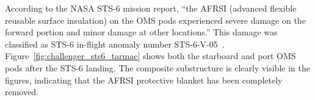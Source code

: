 According to the NASA STS-6 mission report, ``the AFRSI (advanced flexible reusable surface insulation) on the OMS pods experienced severe damage on the forward portion and minor damage at other locations.''  This damage was classified as STS-6 in-flight anomaly number STS-6-V-05~\cite{shuttle_ifa_list}. Figure~\ref{fig:challenger_sts6_tarmac} shows both the starboard and port OMS pods after the STS-6 landing.  The composite substructure is clearly visible in the figures, indicating that the AFRSI protective blanket has been completely removed.
\begin{figure}[hbtp]
  \begin{center}
     \\

\end{center}
\end{figure}
